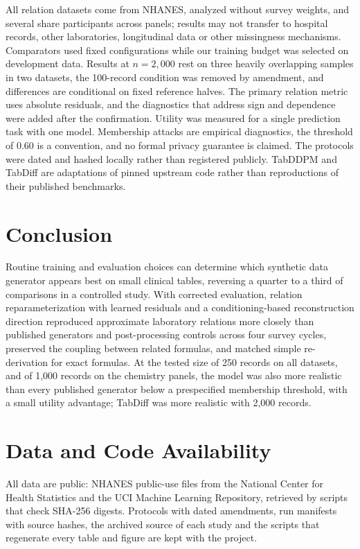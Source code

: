 \documentclass[conference]{IEEEtran}
\begin{document}
All relation datasets come from NHANES, analyzed without survey weights, and several share participants across panels; results may not transfer to hospital records, other laboratories, longitudinal data or other missingness mechanisms. Comparators used fixed configurations while our training budget was selected on development data. Results at $n = 2{,}000$ rest on three heavily overlapping samples in two datasets, the 100-record condition was removed by amendment, and differences are conditional on fixed reference halves. The primary relation metric uses absolute residuals, and the diagnostics that address sign and dependence were added after the confirmation. Utility was measured for a single prediction task with one model. Membership attacks are empirical diagnostics, the threshold of 0.60 is a convention, and no formal privacy guarantee is claimed. The protocols were dated and hashed locally rather than registered publicly. TabDDPM and TabDiff are adaptations of pinned upstream code rather than reproductions of their published benchmarks.

\section{Conclusion}

Routine training and evaluation choices can determine which synthetic data generator appears best on small clinical tables, reversing a quarter to a third of comparisons in a controlled study. With corrected evaluation, relation reparameterization with learned residuals and a conditioning-based reconstruction direction reproduced approximate laboratory relations more closely than published generators and post-processing controls across four survey cycles, preserved the coupling between related formulas, and matched simple re-derivation for exact formulas. At the tested size of 250 records on all datasets, and of 1,000 records on the chemistry panels, the model was also more realistic than every published generator below a prespecified membership threshold, with a small utility advantage; TabDiff was more realistic with 2,000 records.

\section*{Data and Code Availability}

All data are public: NHANES public-use files from the National Center for Health Statistics and the UCI Machine Learning Repository, retrieved by scripts that check SHA-256 digests. Protocols with dated amendments, run manifests with source hashes, the archived source of each study and the scripts that regenerate every table and figure are kept with the project.
\end{document}
